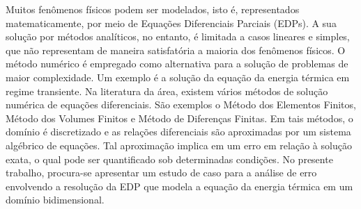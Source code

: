\documentclass[a0,portrait]{a0poster}
\begin{document}
\begin{minipage}[c]{\linewidth}
\begin{framed}
\begin{multicols}{2}
Muitos fenômenos físicos podem ser modelados, isto é, representados matematicamente, por meio de Equações Diferenciais Parciais (EDPs). A sua solução por métodos analíticos, no entanto, é limitada a casos lineares e simples, que não representam de maneira satisfatória a maioria dos fenômenos físicos. O método numérico é empregado como alternativa para a solução de problemas de maior complexidade. Um exemplo é a solução da equação da energia térmica em regime transiente. Na literatura da área, existem vários métodos de solução numérica de equações diferenciais. São exemplos o Método dos Elementos Finitos, Método dos Volumes Finitos e Método de Diferenças Finitas. Em tais métodos, o domínio é discretizado e as relações diferenciais são aproximadas por um sistema  algébrico de equações. Tal aproximação implica em um erro em relação à solução exata, o qual pode ser quantificado sob determinadas condições. No presente trabalho, procura-se apresentar um estudo de caso para a análise de erro envolvendo a resolução da EDP que modela a equação da energia térmica em um domínio bidimensional. 


\color{Black}

\end{multicols}
\end{framed}
\end{minipage}
\end{document}
